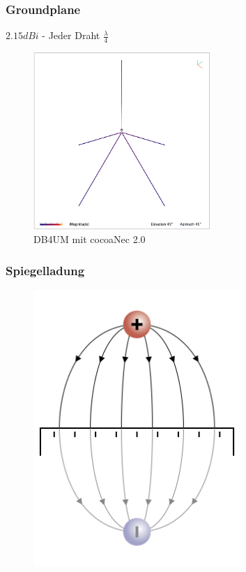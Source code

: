 \begin{frame}
  \frametitle{Groundplane}
  $2.15dBi$ - Jeder Draht $\frac{\lambda}{4}$
  \begin{center}
    \begin{figure}
      \includegraphics[width=0.6\textwidth,height=.7\textheight,keepaspectratio]{e11/GP-DB4UM.png}
      \caption{DB4UM mit cocoaNec 2.0}
    \end{figure}
  \end{center}
\end{frame}

\begin{frame}
  \frametitle{Spiegelladung}
  \begin{center}
    \begin{figure}
      \includegraphics[width=0.7\textwidth,height=.75\textheight,keepaspectratio]{e11/Spiegelladung.png}
    \end{figure}
  \end{center}
\end{frame}

